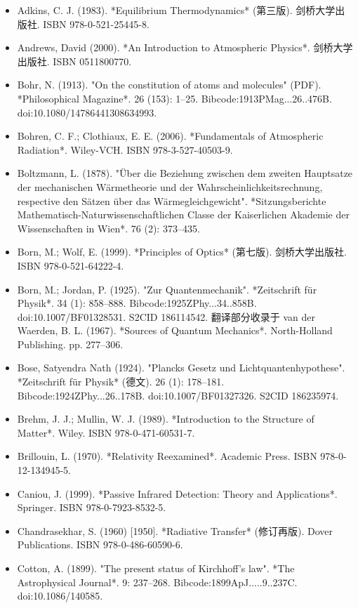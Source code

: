 \begin{itemize}
\item Adkins, C. J. (1983). *Equilibrium Thermodynamics* (第三版). 剑桥大学出版社. ISBN 978-0-521-25445-8.  
\item Andrews, David (2000). *An Introduction to Atmospheric Physics*. 剑桥大学出版社. ISBN 0511800770.  
\item Bohr, N. (1913). "On the constitution of atoms and molecules" (PDF). *Philosophical Magazine*. 26 (153): 1–25. Bibcode:1913PMag...26..476B. doi:10.1080/14786441308634993.  
\item Bohren, C. F.; Clothiaux, E. E. (2006). *Fundamentals of Atmospheric Radiation*. Wiley-VCH. ISBN 978-3-527-40503-9.  
\item Boltzmann, L. (1878). "Über die Beziehung zwischen dem zweiten Hauptsatze der mechanischen Wärmetheorie und der Wahrscheinlichkeitsrechnung, respective den Sätzen über das Wärmegleichgewicht". *Sitzungsberichte Mathematisch-Naturwissenschaftlichen Classe der Kaiserlichen Akademie der Wissenschaften in Wien*. 76 (2): 373–435.  
\item Born, M.; Wolf, E. (1999). *Principles of Optics* (第七版). 剑桥大学出版社. ISBN 978-0-521-64222-4.  
\item Born, M.; Jordan, P. (1925). "Zur Quantenmechanik". *Zeitschrift für Physik*. 34 (1): 858–888. Bibcode:1925ZPhy...34..858B. doi:10.1007/BF01328531. S2CID 186114542.  
  翻译部分收录于 van der Waerden, B. L. (1967). *Sources of Quantum Mechanics*. North-Holland Publishing. pp. 277–306.  
\item Bose, Satyendra Nath (1924). "Plancks Gesetz und Lichtquantenhypothese". *Zeitschrift für Physik* (德文). 26 (1): 178–181. Bibcode:1924ZPhy...26..178B. doi:10.1007/BF01327326. S2CID 186235974.  
\item Brehm, J. J.; Mullin, W. J. (1989). *Introduction to the Structure of Matter*. Wiley. ISBN 978-0-471-60531-7.
\item Brillouin, L. (1970). *Relativity Reexamined*. Academic Press. ISBN 978-0-12-134945-5.  
\item Caniou, J. (1999). *Passive Infrared Detection: Theory and Applications*. Springer. ISBN 978-0-7923-8532-5.  
\item Chandrasekhar, S. (1960) [1950]. *Radiative Transfer* (修订再版). Dover Publications. ISBN 978-0-486-60590-6.  
\item Cotton, A. (1899). "The present status of Kirchhoff's law". *The Astrophysical Journal*. 9: 237–268. Bibcode:1899ApJ.....9..237C. doi:10.1086/140585.  

\end{itemize}
